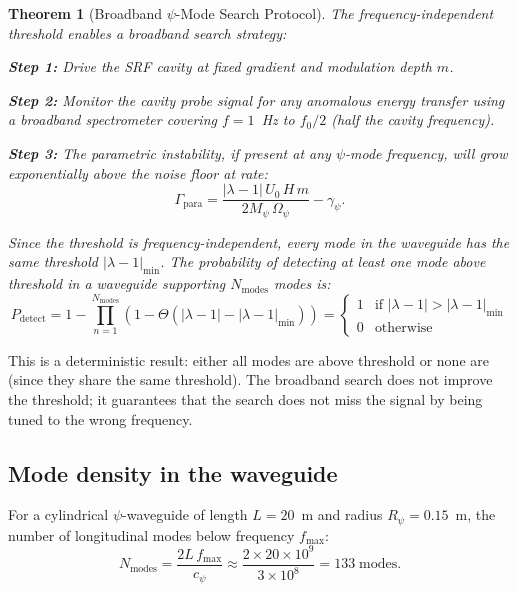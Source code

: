\documentclass[11pt]{article}
\newtheorem{theorem}{Theorem}[section]
\theoremstyle{definition}
\theoremstyle{remark}
\newcommand{\lam}{\lambda}
\newcommand{\Opsi}{\Omega_\psi}
\newcommand{\gpsi}{\gamma_\psi}
\newcommand{\Mpsi}{M_\psi}
\begin{document}
\begin{theorem}[Broadband $\psi$-Mode Search Protocol]
\label{thm:broadband}
The frequency-independent threshold enables a \emph{broadband} search
strategy:

\textbf{Step 1:} Drive the SRF cavity at fixed gradient and modulation
depth $m$.

\textbf{Step 2:} Monitor the cavity probe signal for \emph{any}
anomalous energy transfer using a broadband spectrometer covering
$f = 1$~Hz to $f_0/2$ (half the cavity frequency).

\textbf{Step 3:} The parametric instability, if present at any $\psi$-mode
frequency, will grow exponentially above the noise floor at rate:
\begin{equation}
\Gamma_{\mathrm{para}} = \frac{|\lam-1|\,U_0\,H\,m}{2\Mpsi\,\Opsi} - \gpsi.
\end{equation}

Since the threshold is frequency-independent, every mode in the
waveguide has the same threshold $|\lam-1|_{\mathrm{min}}$. The
probability of detecting \emph{at least one} mode above threshold
in a waveguide supporting $N_{\mathrm{modes}}$ modes is:
\begin{equation}
\boxed{
P_{\mathrm{detect}} = 1 - \prod_{n=1}^{N_{\mathrm{modes}}}
\left(1 - \Theta(|\lam-1| - |\lam-1|_{\mathrm{min}})\right)
= \begin{cases} 1 & \text{if } |\lam-1| > |\lam-1|_{\mathrm{min}} \\
0 & \text{otherwise} \end{cases}
}
\label{eq:broadband-detect}
\end{equation}
\end{theorem}

This is a deterministic result: either all modes are above threshold or
none are (since they share the same threshold). The broadband search does
not improve the threshold; it guarantees that the search does not miss
the signal by being tuned to the wrong frequency.

\subsection{Mode density in the waveguide}

For a cylindrical $\psi$-waveguide of length $L = 20$~m and radius
$R_\psi = 0.15$~m, the number of longitudinal modes below frequency
$f_{\max}$:
\begin{equation}
N_{\mathrm{modes}} = \frac{2L\,f_{\max}}{c_\psi}
\approx \frac{2\times20\times10^9}{3\times10^8} = 133\;\text{modes}.
\end{equation}
\end{document}
